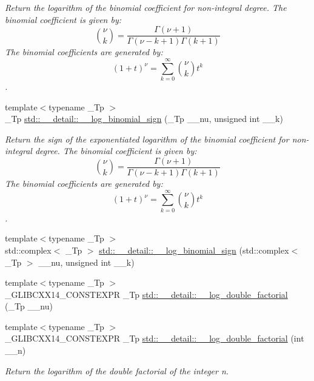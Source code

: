 \begin{DoxyCompactItemize}
\begin{DoxyCompactList}\small\item\em Return the logarithm of the binomial coefficient for non-\/integral degree. The binomial coefficient is given by\+: \[ \binom{\nu}{k} = \frac{\Gamma(\nu+1)}{\Gamma(\nu-k+1) \Gamma(k+1)} \] The binomial coefficients are generated by\+: \[ \left(1 + t\right)^\nu = \sum_{k=0}^\infty \binom{\nu}{k} t^k \]. \end{DoxyCompactList}\item 
{\footnotesize template$<$typename \+\_\+\+Tp $>$ }\\\+\_\+\+Tp \hyperlink{namespacestd_1_1____detail_aa89a8a5ced6325e1d64782f84e4ad95d}{std\+::\+\_\+\+\_\+detail\+::\+\_\+\+\_\+log\+\_\+binomial\+\_\+sign} (\+\_\+\+Tp \+\_\+\+\_\+nu, unsigned int \+\_\+\+\_\+k)
\begin{DoxyCompactList}\small\item\em Return the sign of the exponentiated logarithm of the binomial coefficient for non-\/integral degree. The binomial coefficient is given by\+: \[ \binom{\nu}{k} = \frac{\Gamma(\nu+1)}{\Gamma(\nu-k+1) \Gamma(k+1)} \] The binomial coefficients are generated by\+: \[ \left(1 + t\right)^\nu = \sum_{k=0}^\infty \binom{\nu}{k} t^k \]. \end{DoxyCompactList}\item 
{\footnotesize template$<$typename \+\_\+\+Tp $>$ }\\std\+::complex$<$ \+\_\+\+Tp $>$ \hyperlink{namespacestd_1_1____detail_ad73e7e0dfab6a4f54af026fa3d9e9c9a}{std\+::\+\_\+\+\_\+detail\+::\+\_\+\+\_\+log\+\_\+binomial\+\_\+sign} (std\+::complex$<$ \+\_\+\+Tp $>$ \+\_\+\+\_\+nu, unsigned int \+\_\+\+\_\+k)
\item 
{\footnotesize template$<$typename \+\_\+\+Tp $>$ }\\\+\_\+\+G\+L\+I\+B\+C\+X\+X14\+\_\+\+C\+O\+N\+S\+T\+E\+X\+PR \+\_\+\+Tp \hyperlink{namespacestd_1_1____detail_ad7606a8224ac0c2256996b91051a48a5}{std\+::\+\_\+\+\_\+detail\+::\+\_\+\+\_\+log\+\_\+double\+\_\+factorial} (\+\_\+\+Tp \+\_\+\+\_\+nu)
\item 
{\footnotesize template$<$typename \+\_\+\+Tp $>$ }\\\+\_\+\+G\+L\+I\+B\+C\+X\+X14\+\_\+\+C\+O\+N\+S\+T\+E\+X\+PR \+\_\+\+Tp \hyperlink{namespacestd_1_1____detail_aa832ed1d29fd41c40cf892cc1feef7e9}{std\+::\+\_\+\+\_\+detail\+::\+\_\+\+\_\+log\+\_\+double\+\_\+factorial} (int \+\_\+\+\_\+n)
\begin{DoxyCompactList}\small\item\em Return the logarithm of the double factorial of the integer n. \end{DoxyCompactList}\item 

\end{DoxyCompactItemize}
